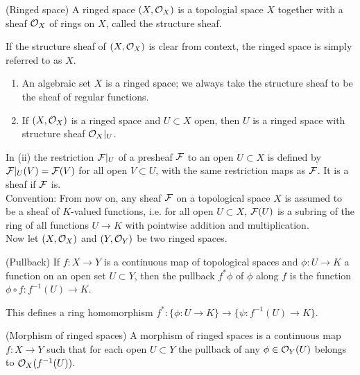 \documentclass[a4paper,11pt]{article}
\begin{document}
			\begin{defi}(Ringed space)
				A ringed space $(X,\mathcal{O}_X)$ is a topologial space $X$ together with a sheaf $\mathcal{O}_X$ of rings on $X$, called the structure sheaf.
			\end{defi}

			If the structure sheaf of $(X,\mathcal{O}_X)$ is clear from context, the ringed space is simply referred to as $X$.

			\begin{eg}
				\begin{enumerate}
					\item An algebraic set $X$ is a ringed space; we always take the structure sheaf to be the sheaf of regular functions.
					\item If $(X,\mathcal{O}_X)$ is a ringed space and $U\subset X$ open, then $U$ is a ringed space with structure sheaf $\mathcal{O}_X|_U$.
				\end{enumerate}
			\end{eg}

			In (ii) the restriction $\mathcal{F}|_U$ of a presheaf $\mathcal{F}$ to an open $U\subset X$ is defined by $\mathcal{F}|_U(V)=\mathcal{F}(V)$ for all open $V\subset U$, with the same restriction maps as $\mathcal{F}$. It is a sheaf if $\mathcal{F}$ is.
			\\

			\noindent Convention: From now on, any sheaf $\mathcal{F}$ on a topological space $X$ is assumed to be a sheaf of $K$-valued functions, i.e. for all open $U\subset X$, $\mathcal{F}(U)$ is a subring of the ring of all functions $U\rightarrow K$ with pointwise addition and multiplication.
			\\

			\noindent Now let $(X,\mathcal{O}_X)$ and $(Y,\mathcal{O}_Y)$ be two ringed spaces.

			\begin{defi}(Pullback)
				If $f:X\rightarrow Y$ is a continuous map of topological spaces and $\phi:U\rightarrow K$ a function on an open set $U\subset Y$, then the pullback $f^\ast\phi$ of $\phi$ along $f$ is the function $\phi\circ f:f^{-1}(U)\rightarrow K$.
			\end{defi}

			\begin{remark}
				This defines a ring homomorphism $f^\ast:\{\phi:U\rightarrow K\}\rightarrow\{\psi:f^{-1}(U)\rightarrow K\}$.
			\end{remark}

			\begin{defi}(Morphism of ringed spaces)
				A morphism of ringed spaces is a continuous map $f:X\rightarrow Y$ such that for each open $U\subset Y$ the pullback of any $\phi\in\mathcal{O}_Y(U)$ belongs to $\mathcal{O}_X(f^{-1}(U))$.
			\end{defi}
\end{document}
